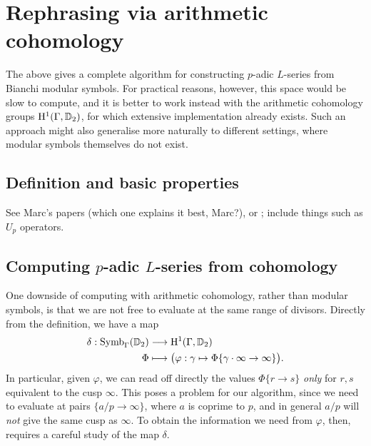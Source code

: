 \documentclass[a4paper,10pt]{article}
\numberwithin{equation}{section}
\begin{document}


\section{Rephrasing via arithmetic cohomology}
The above gives a complete algorithm for constructing $p$-adic $L$-series from Bianchi modular symbols. For practical reasons, however, this space would be slow to compute, and it is better to work instead with the arithmetic cohomology groups $\mathrm{H}^1(\Gamma,\mathbb{D}_2)$, for which extensive implementation already exists. Such an approach might also generalise more naturally to different settings, where modular symbols themselves do not exist.

\subsection{Definition and basic properties}
See Marc's papers (which one explains it best, Marc?), or  \cite{PP09}; include things such as $U_p$ operators.



\subsection{Computing \texorpdfstring{$p$}{p}-adic \texorpdfstring{$L$}{L}-series from cohomology}

One downside of computing with arithmetic cohomology, rather than modular symbols, is that we are not free to evaluate at the same range of divisors. Directly from the definition, we have a map
\begin{align*}
	\delta : \mathrm{Symb}_{\Gamma}(\mathbb{D}_2) &\longrightarrow \mathrm{H}^1(\Gamma,\mathbb{D}_2)\\
    \Phi &\longmapsto \big(\varphi: \gamma \mapsto \Phi\{\gamma\cdot\infty \rightarrow \infty\}\big).
\end{align*}
In particular, given $\varphi$, we can read off directly the values $\Phi\{r \to s\}$ \emph{only} for $r,s$ equivalent to the cusp $\infty$. This poses a problem for our algorithm, since we need to evaluate at pairs $\{a/p \to \infty\}$, where $a$ is coprime to $p$, and in general $a/p$ will \emph{not} give the same cusp as $\infty$. To obtain the information we need from $\varphi$, then, requires a careful study of the map $\delta$.
\end{document}
